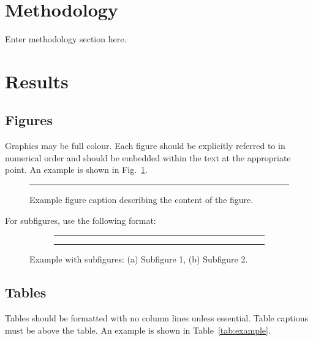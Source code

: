 \documentclass[a4paper, 10pt, twocolumn]{article}
\begin{document}
\section{Methodology}

Enter methodology section here.


\section{Results}

\subsection{Figures}

Graphics may be full colour. Each figure should be explicitly referred to in numerical order and should be embedded within the text at the appropriate point. An example is shown in Fig.~\ref{fig:example}.

\begin{figure}[htbp]
  \centering
  \rule{\columnwidth}{3cm}  %
  \caption{Example figure caption describing the content of the figure.}
  \label{fig:example}
\end{figure}

For subfigures, use the following format:

\begin{figure}[htbp]
  \centering
  \begin{subfigure}[b]{0.48\columnwidth}
    \centering
    \rule{\textwidth}{2.5cm}  %
    \caption{}
    \label{fig:sub1}
  \end{subfigure}
  \hfill
  \begin{subfigure}[b]{0.48\columnwidth}
    \centering
    \rule{\textwidth}{2.5cm}  %
    \caption{}
    \label{fig:sub2}
  \end{subfigure}
  \caption{Example with subfigures: (a) Subfigure 1, (b) Subfigure 2.}
  \label{fig:subfigures}
\end{figure}

\subsection{Tables}

Tables should be formatted with no column lines unless essential. Table captions must be above the table. An example is shown in Table~\ref{tab:example}.
\end{document}
